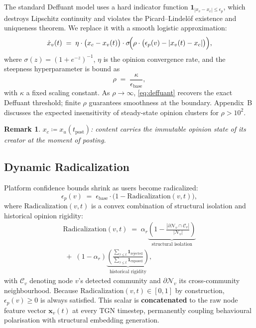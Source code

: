\documentclass[11pt]{article}
\newtheorem{remark}{Remark}
\newcommand{\bx}{\mathbf{x}}
\newcommand{\cN}{\mathcal{N}}
\newcommand{\cC}{\mathcal{C}}
\newcommand{\Rad}{\text{Radicalization}}
\begin{document}
The standard Deffuant model uses a hard indicator function
$\mathbf{1}_{|x_v - x_c|\le\epsilon_p}$, which destroys Lipschitz continuity
and violates the Picard--Lindelöf existence and uniqueness theorem. We replace it
with a smooth logistic approximation:
\begin{equation}
  \dot{x}_v(t)
  \;=\;
  \eta\cdot\bigl(x_c - x_v(t)\bigr)\cdot
  \sigma\!\Bigl(\rho\cdot\bigl(\epsilon_p(v) - |x_v(t) - x_c|\bigr)\Bigr),
  \label{eq:deffuant}
\end{equation}
where $\sigma(z) = (1+e^{-z})^{-1}$, $\eta$ is the opinion convergence rate,
and the steepness hyperparameter is bound as
\begin{equation}
  \rho \;=\; \frac{\kappa}{\epsilon_{\mathrm{base}}},
  \label{eq:rho}
\end{equation}
with $\kappa$ a fixed scaling constant. As $\rho\to\infty$, \cref{eq:deffuant}
recovers the exact Deffuant threshold; finite $\rho$ guarantees smoothness at
the boundary. Appendix~B discusses the expected insensitivity of steady-state
opinion clusters for $\rho > 10^2$.

\begin{remark}
$x_c \coloneqq x_u(t_{\mathrm{post}})$: content carries the immutable opinion
state of its creator at the moment of posting.
\end{remark}

\subsection{Dynamic Radicalization}
\label{sec:radicalization}

Platform confidence bounds shrink as users become radicalized:
\begin{equation}
  \epsilon_p(v) \;=\; \epsilon_{\mathrm{base}}\cdot
  \bigl(1 - \Rad(v,t)\bigr),
  \label{eq:epsilon-p}
\end{equation}
where $\Rad(v,t)$ is a convex combination of structural isolation and
historical opinion rigidity:
\begin{multline}
  \Rad(v,t)
  \;=\;
  \alpha_r\underbrace{\left(
    1 - \frac{|\partial\cN_v\cap\cC_v|}{|\cN_v|}
  \right)}_{\text{structural isolation}} \\
  \;+\;
  (1-\alpha_r)\underbrace{\left(
    \frac{\sum_{\tau\le t}\mathbf{1}_{\mathrm{rejected}}}
         {\sum_{\tau\le t}\mathbf{1}_{\mathrm{exposed}}}
  \right)}_{\text{historical rigidity}},
  \label{eq:radicalization}
\end{multline}
with $\cC_v$ denoting node $v$'s detected community and
$\partial\cN_v$ its cross-community neighbourhood. Because
$\Rad(v,t)\in[0,1]$ by construction, $\epsilon_p(v)\ge 0$ is always
satisfied. This scalar is \textbf{concatenated} to the raw node feature
vector $\bx_v(t)$ at every TGN timestep, permanently coupling behavioural
polarisation with structural embedding generation.
\end{document}
